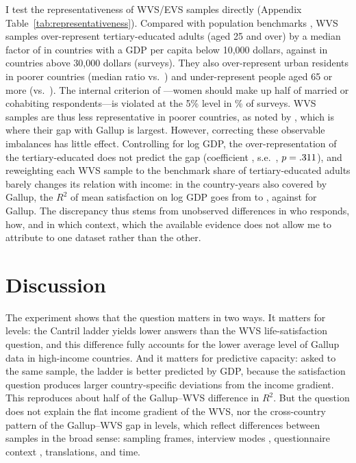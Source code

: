 \documentclass[12pt]{article}
\begin{document}
I test the representativeness of WVS/EVS samples directly (Appendix Table~\ref{tab:representativeness}). Compared with population benchmarks \citep{barro_new_2013,worldbank_wdi_2026}, WVS samples over-represent tertiary-educated adults (aged 25 and over) by a median factor of \ratioTertiaryLow in countries with a GDP per capita below 10,000 dollars, against \ratioTertiaryHigh in countries above 30,000 dollars (\nCompositionSurveys surveys). They also over-represent urban residents in poorer countries (median ratio \ratioUrbanLow vs.\ \ratioUrbanHigh) and under-represent people aged 65 or more (\ratioOldLow vs.\ \ratioOldHigh). The internal criterion of \citet{kohler_surveys_2007}---women should make up half of married or cohabiting respondents---is violated at the 5\% level in \shareGenderFlag\% of surveys. WVS samples are thus less representative in poorer countries, as noted by \citet{deaton_income_2008}, which is where their gap with Gallup is largest. However, correcting these observable imbalances has little effect. Controlling for log GDP, the over-representation of the tertiary-educated does not predict the gap (coefficient \coefTertiaryGap, s.e.\ \seTertiaryGap, $p = .311$), and reweighting each WVS sample to the benchmark share of tertiary-educated adults barely changes its relation with income: in the country-years also covered by Gallup, the $R^2$ of mean satisfaction on log GDP goes from \RtwoCommonWVSraw to \RtwoCommonWVSeduAdj, against \RtwoCommonGallupSub for Gallup. The discrepancy thus stems from unobserved differences in who responds, how, and in which context, which the available evidence does not allow me to attribute to one dataset rather than the other.


\section{Discussion}\label{sec:discussion}
The experiment shows that the question matters in two ways. It matters for levels: the Cantril ladder yields lower answers than the WVS life-satisfaction question, and this difference fully accounts for the lower average level of Gallup data in high-income countries. And it matters for predictive capacity: asked to the same sample, the ladder is better predicted by GDP, because the satisfaction question produces larger country-specific deviations from the income gradient. This reproduces about half of the Gallup--WVS difference in $R^2$. But the question does not explain the flat income gradient of the WVS, nor the cross-country pattern of the Gallup--WVS gap in levels, which reflect differences between samples in the broad sense: sampling frames, interview modes \citep{dolan_happy_2016,conti_survey_2011}, questionnaire context \citep{deaton_financial_2012,deaton_understanding_2016}, translations, and time.
\end{document}

